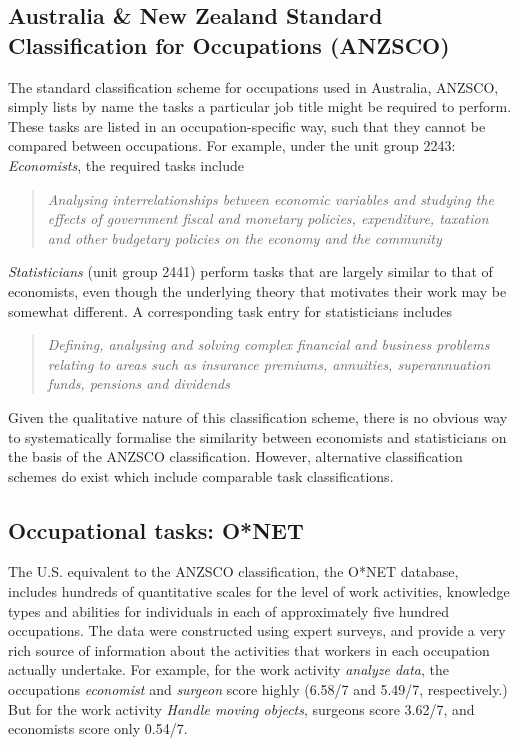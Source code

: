 \subsection{Australia \& New Zealand Standard Classification for Occupations (ANZSCO)}

The standard classification scheme for occupations used in Australia, ANZSCO, simply lists by name the tasks a particular job title might be required to perform. These tasks are listed in an occupation-specific way, such that they cannot be compared between occupations. For example, under the unit group 2243: {\em Economists}, the required tasks include
\begin{quote}
{\em Analysing interrelationships between economic variables and studying the effects of government fiscal and monetary policies, expenditure, taxation and other budgetary policies on the economy and the community \citep[p.185]{Trewin2006}}
\end{quote}

{\em Statisticians} (unit group 2441) perform tasks that are largely similar to that of economists, even though the underlying theory that motivates their work may be somewhat different. A corresponding task entry for statisticians includes
\begin{quote}
{\em Defining, analysing and solving complex financial and business problems relating to areas such as insurance premiums, annuities, superannuation funds, pensions and dividends \citep[p.181]{Trewin2006}}
\end{quote}
Given the qualitative nature of this classification scheme, there is no obvious way to systematically formalise the similarity between economists and statisticians on the basis of the ANZSCO classification. However, alternative classification schemes do exist which include comparable task classifications.

\subsection{Occupational tasks: O*NET}\label{sec:onet}

The U.S. equivalent to the ANZSCO classification, the O*NET database, includes hundreds of quantitative scales for the level of work activities, knowledge types and abilities for individuals in each of approximately five hundred occupations. The data were constructed using expert surveys, and provide a very rich source of information about the activities that workers in each occupation actually undertake. For example, for the work activity {\em analyze data}, the occupations {\em economist} and {\em surgeon} score highly (6.58/7 and 5.49/7, respectively.) But for the work activity {\em Handle moving objects}, surgeons score 3.62/7, and economists score only 0.54/7.

